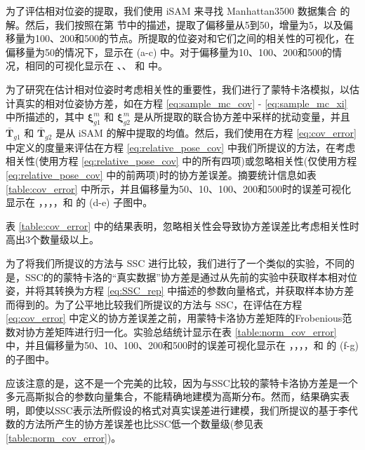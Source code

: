 为了评估相对位姿的提取，我们使用 iSAM \cite{kaess2008isam} 来寻找 Manhattan3500 数据集合 \cite{olson2006fast} 的解。然后，我们按照在第  节中的描述，提取了偏移量从5到50，增量为5，以及偏移量为100、200和500的节点。所提取的位姿对和它们之间的相关性的可视化，在偏移量为50的情况下，显示在  (a-c) 中。对于偏移量为10、100、200和500的情况，相同的可视化显示在 、、 和  中。 

为了研究在估计相对位姿时考虑相关性的重要性，我们进行了蒙特卡洛模拟，以估计真实的相对位姿协方差，如在方程 \eqref{eq:sample_mc_cov} - \eqref{eq:sample_mc_xi} 中所描述的，其中 $\boldsymbol{\xi}_{g1}^{m}$ 和 $\boldsymbol{\xi}_{g2}^{m}$ 是从所提取的联合协方差中采样的扰动变量，并且 $\bar{\mathbf{T}}_{g1}$ 和 $\bar{\mathbf{T}}_{g2}$ 是从 iSAM 的解中提取的均值。然后，我们使用在方程 \eqref{eq:cov_error} 中定义的度量来评估在方程 \eqref{eq:relative_pose_cov} 中我们所提议的方法，在考虑相关性(使用方程 \eqref{eq:relative_pose_cov} 中的所有四项)或忽略相关性(仅使用方程 \eqref{eq:relative_pose_cov} 中的前两项)时的协方差误差。摘要统计信息如表 \ref{table:cov_error} 中所示，并且偏移量为50、10、100、200和500时的误差可视化显示在 ，，，，和  的 (d-e) 子图中。 

表 \ref{table:cov_error} 中的结果表明，忽略相关性会导致协方差误差比考虑相关性时高出$3$个数量级以上。 

为了将我们所提议的方法与 SSC \cite{smith1990a} 进行比较，我们进行了一个类似的实验，不同的是，SSC的的蒙特卡洛的“真实数据”协方差是通过从先前的实验中获取样本相对位姿，并将其转换为方程 \eqref{eq:SSC_rep} 中描述的参数向量格式，并获取样本协方差而得到的。为了公平地比较我们所提议的方法与 SSC，在评估在方程 \eqref{eq:cov_error} 中定义的协方差误差之前，用蒙特卡洛协方差矩阵的Frobenious范数对协方差矩阵进行归一化。实验总结统计显示在表 \ref{table:norm_cov_error} 中，并且偏移量为50、10、100、200和500时的误差可视化显示在 ，，，，和  的 (f-g) 的子图中。 

应该注意的是，这不是一个完美的比较，因为与SSC比较的蒙特卡洛协方差是一个多元高斯拟合的参数向量集合，不能精确地建模为高斯分布。然而，结果确实表明，即使以SSC表示法所假设的格式对真实误差进行建模，我们所提议的基于李代数的方法所产生的协方差误差也比SSC低一个数量级(参见表 \ref{table:norm_cov_error})。 

